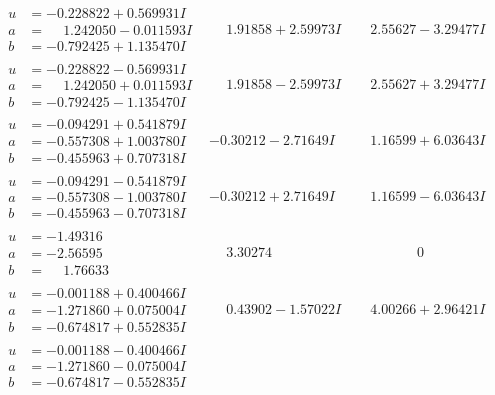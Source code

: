 \documentclass[1p]{elsarticle_modified}
\theoremstyle{definition}
\begin{document}
$$\begin{array}{c|c|c}
\begin{aligned}
u &= -0.228822 + 0.569931 I \\
a &= \phantom{-}1.242050 - 0.011593 I \\
b &= -0.792425 + 1.135470 I\end{aligned}
 & \phantom{-}1.91858 + 2.59973 I & \phantom{-}2.55627 - 3.29477 I \\ \hline\begin{aligned}
u &= -0.228822 - 0.569931 I \\
a &= \phantom{-}1.242050 + 0.011593 I \\
b &= -0.792425 - 1.135470 I\end{aligned}
 & \phantom{-}1.91858 - 2.59973 I & \phantom{-}2.55627 + 3.29477 I \\ \hline\begin{aligned}
u &= -0.094291 + 0.541879 I \\
a &= -0.557308 + 1.003780 I \\
b &= -0.455963 + 0.707318 I\end{aligned}
 & -0.30212 - 2.71649 I & \phantom{-}1.16599 + 6.03643 I \\ \hline\begin{aligned}
u &= -0.094291 - 0.541879 I \\
a &= -0.557308 - 1.003780 I \\
b &= -0.455963 - 0.707318 I\end{aligned}
 & -0.30212 + 2.71649 I & \phantom{-}1.16599 - 6.03643 I \\ \hline\begin{aligned}
u &= -1.49316\phantom{ +0.000000I} \\
a &= -2.56595\phantom{ +0.000000I} \\
b &= \phantom{-}1.76633\phantom{ +0.000000I}\end{aligned}
 & \phantom{-}3.30274\phantom{ +0.000000I} & \phantom{-0.000000 } 0 \\ \hline\begin{aligned}
u &= -0.001188 + 0.400466 I \\
a &= -1.271860 + 0.075004 I \\
b &= -0.674817 + 0.552835 I\end{aligned}
 & \phantom{-}0.43902 - 1.57022 I & \phantom{-}4.00266 + 2.96421 I \\ \hline\begin{aligned}
u &= -0.001188 - 0.400466 I \\
a &= -1.271860 - 0.075004 I \\
b &= -0.674817 - 0.552835 I\end{aligned}

\end{array}$$
\end{document}
